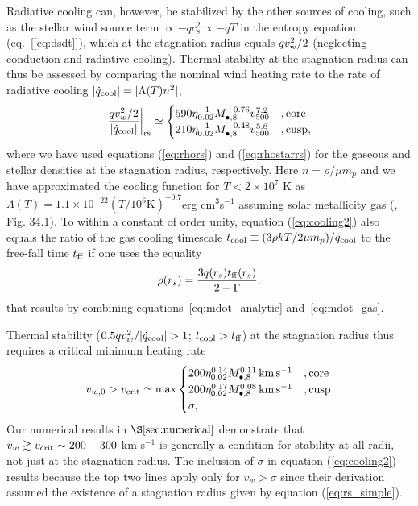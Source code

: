 \documentclass[usenatbib,fleqn]{mn2e}
\newcommand{\rs}{r_s}
\newcommand{\vw}{v_w}
\newcommand{\tff}{t_{\rm ff}}
\begin{document}
Radiative cooling can, however, be stabilized by the other sources of cooling, such as the stellar wind source term $\propto -q c_{s}^{2} \propto -qT$ in the entropy equation (eq.~[\ref{eq:dsdt}]), which at the stagnation radius equals $q v_{\rm w}^{2}/2$ (neglecting conduction and radiative cooling).  Thermal stability at the stagnation radius can thus be assessed by comparing the nominal wind heating rate to the rate of radiative cooling $|\dot{q}_{\rm cool}| =|\Lambda(T) n^2|$,
\begin{align}
\left.\frac{q \vw^2/2}{|\dot{q}_{\rm cool}|}\right|_{\rm r{s}} \simeq
  \begin{cases}
   590 \eta_{0.02}^{-1} M_{\bullet,8}^{-0.76}v_{500}^{7.2}  &, \text{core}\\
   210 \eta_{0.02}^{-1} M_{\bullet,8}^{-0.48}v_{500}^{5.8}  &, \text{cusp},     
  \end{cases}
  \label{eq:cooling2}
\end{align}
where we have used equations (\ref{eq:rhors}) and (\ref{eq:rhostarrs}) for the gaseous and stellar densities at the stagnation radius, respectively.  Here $n = \rho/\mu m_p$ and we have approximated the cooling function for $T < 2\times 10^{7}$ K as $\Lambda(T) = 1.1 \times 10^{-22} \left(T/10^6 \text{K}\right)^{-0.7}  $erg cm$^3 $s$^{-1}$ assuming solar metallicity gas (\citealt{Draine:2011a}, Fig. 34.1).  To within a constant of order unity, equation (\ref{eq:cooling2}) also equals the ratio of the gas cooling timescale $t_{\rm cool} \equiv (3\rho kT/2\mu m_p)/\dot{q}_{\rm cool}$ to the free-fall time $t_{\rm ff}$ if one uses the equality 
\begin{align}
\rho(\rs)=\frac{3 q(\rs) \tff(\rs)}{2-\Gamma}.
\label{eq:rhors2}
\end{align}
that results by combining equations~\eqref{eq:mdot_analytic} and~\eqref{eq:mdot_gas}.

Thermal stability ($0.5 q \vw^2/|\dot{q}_{\rm cool}| > 1$; $t_{\rm cool} > t_{\rm ff}$) at the stagnation radius thus requires a critical minimum heating rate
\begin{align}
v_{w,0} > v_{\rm crit} \simeq
  {\rm max}\begin{cases}
   200 \eta_{0.02}^{0.14} M_{\bullet,8}^{0.11}\,{\rm km\,s^{-1}}  &, \text{core}\\
   200 \eta_{0.02}^{0.17} M_{\bullet,8}^{0.08}\,{\rm km\,s^{-1}}   &, \text{cusp}\\
\sigma,     
  \end{cases}
  \label{eq:cooling2}
\end{align}
Our numerical results in $\S\ref{sec:numerical}$ demonstrate that $v_{w} \gtrsim v_{\rm crit} \sim 200-300$ km s$^{-1}$ is generally a condition for stability at all radii, not just at the stagnation radius.  The inclusion of $\sigma$ in equation (\ref{eq:cooling2}) results because the top two lines apply only for $v_{w} > \sigma$ since their derivation assumed the existence of a stagnation radius given by equation (\ref{eq:rs_simple}).
\end{document}
